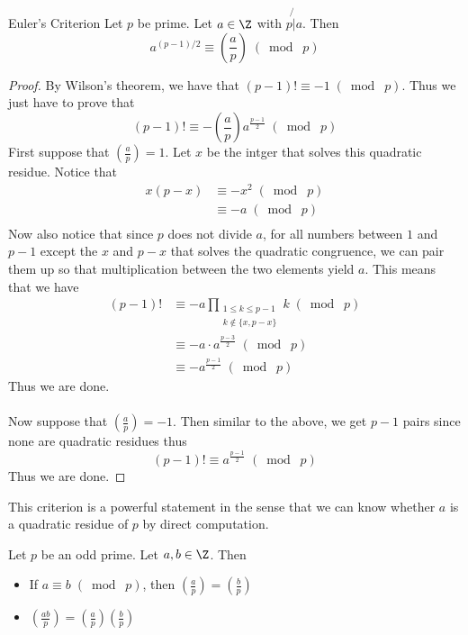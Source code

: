 \documentclass[a4paper]{article}
\begin{document}
\begin{thm}{Euler's Criterion}{} Let $p$ be prime. Let $a\in\Z$ with $p\not{|}a$. Then $$a^{(p-1)/2}\equiv\left(\frac{a}{p}\right)\;(\bmod\; p)$$ \tcbline
\begin{proof}
By Wilson's theorem, we have that $(p-1)!\equiv -1\;(\bmod\;p)$. Thus we just have to prove that $$(p-1)!\equiv-\left(\frac{a}{p}\right)a^{\frac{p-1}{2}}\;(\bmod\;p)$$
First suppose that $\left(\frac{a}{p}\right)=1$. Let $x$ be the intger that solves this quadratic residue. Notice that 
\begin{align*}
x(p-x)&\equiv -x^2\;(\bmod\;p)\\
&\equiv -a\;(\bmod\;p)\\
\end{align*}
Now also notice that since $p$ does not divide $a$, for all numbers between $1$ and $p-1$ except the $x$ and $p-x$ that solves the quadratic congruence, we can pair them up so that multiplication between the two elements yield $a$. This means that we have 
\begin{align*}
(p-1)!&\equiv -a\prod_{\substack{1\leq k\leq p-1\\k\notin\{x,p-x\}}}k\;(\bmod\;p)\\
&\equiv -a\cdot a^{\frac{p-3}{2}}\;(\bmod\;p)\\
&\equiv -a^{\frac{p-1}{2}}\;(\bmod\;p)
\end{align*}
Thus we are done. \\~\\
Now suppose that $\left(\frac{a}{p}\right)=-1$. Then similar to the above, we get $p-1$ pairs since none are quadratic residues thus $$(p-1)!\equiv a^{\frac{p-1}{2}}\;(\bmod\;p)$$
Thus we are done. 
\end{proof}
\end{thm}

This criterion is a powerful statement in the sense that we can know whether $a$ is a quadratic residue of $p$ by direct computation. 

\begin{prp}{}{} Let $p$ be an odd prime. Let $a,b\in\Z$. Then
\begin{itemize}
\item If $a\equiv b\;(\bmod\; p)$, then $\left(\frac{a}{p}\right)=\left(\frac{b}{p}\right)$
\item $\left(\frac{ab}{p}\right)=\left(\frac{a}{p}\right)\left(\frac{b}{p}\right)$
\end{itemize}
\end{prp}
\end{document}
